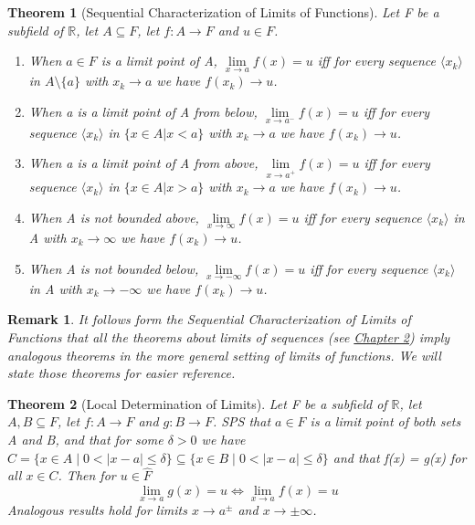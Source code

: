 \documentclass[11pt, oneside]{book}
\theoremstyle{break}
\newtheorem{thm}{Theorem}[section]
\newtheorem*{remark}{Remark}
\newcommand{\bb}[1]{\mathbb{#1}}		%
\begin{document}
\begin{thm}[Sequential Characterization of Limits of Functions]
	Let F be a subfield of $\bb{R}$, let $A \subseteq F$, let $f: A \to F$ and $u \in F$.
	\begin{enumerate}
		\item When $a \in F$ is a limit point of A, $\lim\limits_{x \to a} f(x) = u$ iff for every sequence $\langle x_k \rangle$ in $A \setminus \{a\}$ with $x_k \to a$ we have $f(x_k) \to u$.
		\item When a is a limit point of A from below, $\lim\limits_{x \to a^-} f(x) = u$ iff for every sequence $\langle x_k \rangle$ in $\{x \in A | x < a\}$ with $x_k \to a$ we have $f(x_k) \to u$.
		\item When a is a limit point of A from above, $\lim\limits_{x \to a^+} f(x) = u$ iff for every sequence $\langle x_k \rangle$ in $\{x \in A | x > a\}$ with $x_k \to a$ we have $f(x_k) \to u$.
		\item When A is not bounded above, $\lim\limits_{x \to \infty} f(x) = u$ iff for every sequence $\langle x_k \rangle$ in A with $x_k \to \infty$ we have $f(x_k) \to u$.
		\item When A is not bounded below, $\lim\limits_{x \to -\infty} f(x) = u$ iff for every sequence $\langle x_k \rangle$ in A with $x_k \to -\infty$ we have $f(x_k) \to u$.
	\end{enumerate}
\end{thm}

\begin{remark}
	It follows form the Sequential Characterization of Limits of Functions that all the theorems about limits of sequences (see \hyperref[chp2]{Chapter 2}) imply analogous theorems in the more general setting of limits of functions. We will state those theorems for easier reference.
\end{remark}

\begin{thm}[Local Determination of Limits]
	Let F be a subfield of $\bb{R}$, let $A, B \subseteq F$, let $f: A \to F$ and $g: B \to F$. SPS that $a \in F$ is a limit point of both sets A and B, and that for some $\delta > 0$ we have $C = \{x \in A \; | \; 0 < |x - a| \leq \delta\} \subseteq \{x \in B \; | \; 0 < |x - a| \leq \delta\}$ and that f(x) = g(x) for all $x \in C$. Then for $u \in \hat{F}$
		\[
			\lim_{x \to a} g(x) = u \iff \lim_{x \to a} f(x) = u
		\]
	Analogous results hold for limits $x \to a^\pm$ and $x \to \pm \infty$.
\end{thm}
\end{document}
